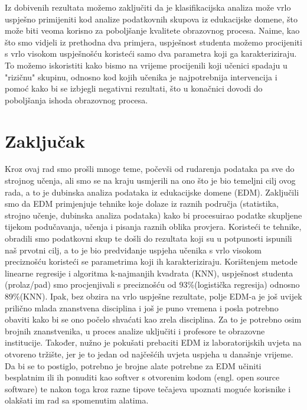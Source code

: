 \documentclass[times, utf8, zavrsni, numeric]{fer}
\begin{document}
Iz dobivenih rezultata možemo zaključiti da je klasifikacijska analiza može vrlo uspješno primijeniti kod analize podatkovnih skupova iz edukacijske domene, što može biti veoma korisno za poboljšanje kvalitete obrazovnog procesa. Naime, kao što smo vidjeli iz prethodna dva primjera, uspješnost studenta možemo procijeniti s vrlo visokom uspješnošću koristeći samo dva parametra koji ga karakteriziraju. To možemo iskoristiti kako bismo na vrijeme procijenili koji učenici spadaju u "rizičnu" skupinu, odnosno kod kojih učenika je najpotrebnija intervencija i pomoć kako bi se izbjegli negativni rezultati, što u konačnici dovodi do poboljšanja ishoda obrazovnog procesa.
\chapter*{Zaključak}
Kroz ovaj rad smo prošli mnoge teme, počevši od rudarenja podataka pa sve do strojnog učenja, ali smo se na kraju usmjerili na ono što je bio temeljni cilj ovog rada, a to je dubinska analiza podataka iz edukacijske domene (EDM). Zaključili smo da EDM primjenjuje tehnike koje dolaze iz raznih područja (statistika, strojno učenje, dubinska analiza podataka) kako bi procesuirao podatke skupljene tijekom podučavanja, učenja i pisanja raznih oblika provjera. Koristeći te tehnike, obradili smo podatkovni skup te došli do rezultata koji su u potpunosti ispunili naš prvotni cilj, a to je bio predviđanje uspjeha učenika s vrlo visokom preciznošću koristeći se parametrima koji ih karakteriziraju. Korištenjem metode linearne regresije i algoritma k-najmanjih kvadrata (KNN), uspješnost studenta (prolaz/pad) smo procjenjivali s preciznošću od 93\%(logistička regresija) odnosno 89\%(KNN). Ipak, bez obzira na vrlo uspješne rezultate,  polje EDM-a je još uvijek prilično mlada znanstvena disciplina i još je puno vremena i posla potrebno obaviti kako bi se ono počelo shvaćati kao zrela disciplina. Za to je potrebno osim brojnih znanstvenika, u proces analize uključiti i profesore te obrazovne institucije. Također, nužno je pokušati prebaciti EDM iz laboratorijskih uvjeta na otvoreno tržište, jer je to jedan od najčešćih uvjeta uspjeha u današnje vrijeme. Da bi se to postiglo, potrebno je brojne alate potrebne za EDM učiniti besplatnim ili ih ponuditi kao softver s otvorenim kodom (engl. open source software) te nakon toga kroz razne tipove tečajeva upoznati moguće korisnike i olakšati im rad sa spomenutim alatima.



\end{document}
